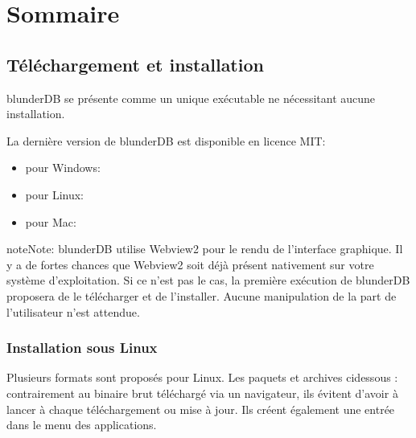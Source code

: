 \documentclass[letterpaper,10pt,french]{sphinxmanual}
\begin{document}
\chapter{Sommaire}
\label{\detokenize{index:sommaire}}
\sphinxstepscope


\section{Téléchargement et installation}
\label{\detokenize{telecharge_install:telechargement-et-installation}}\label{\detokenize{telecharge_install:telecharge-install}}\label{\detokenize{telecharge_install::doc}}
\sphinxAtStartPar
blunderDB se présente comme un unique exécutable ne nécessitant aucune installation.

\sphinxAtStartPar
La dernière version de blunderDB est disponible en licence MIT:
\begin{itemize}
\item {} 
\sphinxAtStartPar
pour Windows: 

\item {} 
\sphinxAtStartPar
pour Linux: 

\item {} 
\sphinxAtStartPar
pour Mac: 

\end{itemize}

\begin{sphinxadmonition}{note}{Note:}
\sphinxAtStartPar
blunderDB utilise Webview2 pour le rendu de l’interface graphique. Il
y a de fortes chances que Webview2 soit déjà présent nativement sur votre
système d’exploitation. Si ce n’est pas le cas, la première exécution de
blunderDB proposera de le télécharger et de l’installer. Aucune manipulation
de la part de l’utilisateur n’est attendue.
\end{sphinxadmonition}


\subsection{Installation sous Linux}
\label{\detokenize{telecharge_install:installation-sous-linux}}
\sphinxAtStartPar
Plusieurs formats sont proposés pour Linux. Les paquets et archives ci\sphinxhyphen{}dessous
 : contrairement au binaire brut
téléchargé via un navigateur, ils évitent d’avoir à lancer  à chaque
téléchargement ou mise à jour. Ils créent également une entrée dans le menu des
applications.
\end{document}
